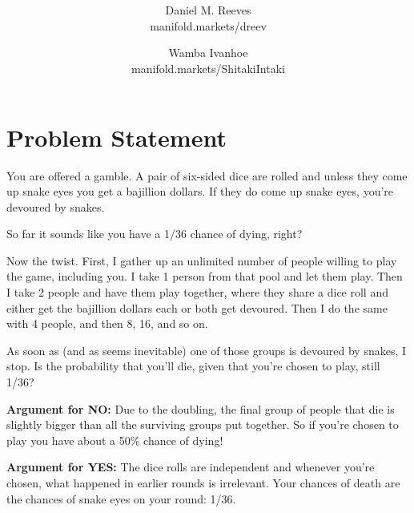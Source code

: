 \documentclass[article,twocolumn]{memoir}
\title{\HUGE\textbf{\longtitle}}
\author{Daniel M. Reeves\\manifold.markets/dreev
\and
Wamba Ivanhoe\\manifold.markets/ShitakiIntaki
}
\date{\protect\tstamp} %
\newcommand{\shorttitle}{Snake Eyes} %
\begin{document}
\pagestyle{headings}
\makeoddhead{headings}{\MakeUppercase{\shorttitle}}{}{\thepage}
\maketitle


\chapter{Problem Statement}

You are offered a gamble.
A pair of six-sided dice are rolled and unless they come up snake eyes you get a bajillion dollars. 
If they do come up snake eyes, you're devoured by snakes.

So far it sounds like you have a 1/36 chance of dying, right?

Now the twist. 
First, I gather up an unlimited number of people willing to play the game, including you. 
I take 1 person from that pool and let them play. 
Then I take 2 people and have them play together, where they share a dice roll and either get the bajillion dollars each or both get devoured. 
Then I do the same with 4 people, and then 8, 16, and so on.

As soon as (and as seems inevitable) one of those groups is devoured by snakes, I stop.
Is the probability that you'll die, given that you're chosen to play, still 1/36?

\vspace{1em}

\textbf{Argument for NO:}
Due to the doubling, the final group of people that die is slightly bigger than all the surviving groups put together. 
So if you're chosen to play you have about a 50\% chance of dying!

\vspace{1em}

\textbf{Argument for YES:}
The dice rolls are independent and whenever you're chosen, what happened in earlier rounds is irrelevant.
Your chances of death are the chances of snake eyes on your round: 1/36.

\vspace{1em}
\end{document}
